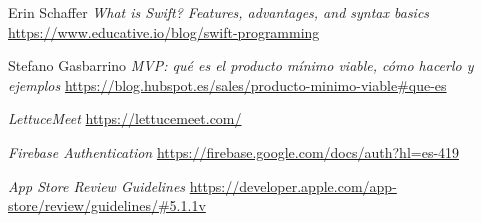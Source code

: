 
\begin{thebibliography}{9}
    Erin Schaffer
    \textit{What is Swift? Features, advantages, and syntax basics}
    \url{https://www.educative.io/blog/swift-programming}

    Stefano Gasbarrino
    \textit{MVP: qué es el producto mínimo viable, cómo hacerlo y ejemplos}
    \url{https://blog.hubspot.es/sales/producto-minimo-viable#que-es}

    \textit{LettuceMeet}
    \url{https://lettucemeet.com/}

    \textit{Firebase Authentication}
    \url{https://firebase.google.com/docs/auth?hl=es-419}

    \textit{App Store Review Guidelines}
    \url{https://developer.apple.com/app-store/review/guidelines/#5.1.1v}

\end{thebibliography}